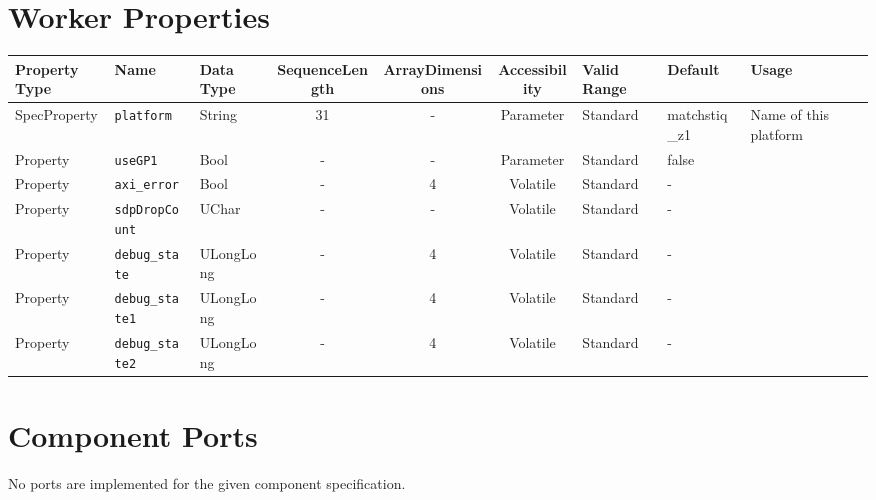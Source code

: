 \documentclass{article}
\begin{document}
\begin{landscape}
	\section*{Worker Properties}
	\begin{scriptsize}
		\begin{tabular}{|p{1.5cm}|p{2.5cm}|p{1.5cm}|c|c|c|p{2cm}|p{2cm}|p{3cm}|}
			\hline
			\rowcolor{blue}
			Property Type & Name                  & Data Type  & SequenceLength & ArrayDimensions & Accessibility       & Valid Range & Default & Usage                        \\
			\hline
			SpecProperty & \verb+platform+       & String & 31            & -               & Parameter           & Standard    & matchstiq\_z1 & Name of this platform  \\
			\hline
			Property     & \verb+useGP1+         & Bool   & -             & -               & Parameter           & Standard    & false   &                              \\
			\hline
			Property     & \verb+axi_error+      & Bool   & -             & 4               & Volatile            & Standard    & -       &                              \\
			\hline
			Property     & \verb+sdpDropCount+   & UChar  & -             & -               & Volatile            & Standard    & -       &                              \\
			\hline
			Property     & \verb+debug_state+    & ULongLong & -          & 4               & Volatile            & Standard    & -       &                              \\
			\hline
			Property     & \verb+debug_state1+   & ULongLong & -          & 4               & Volatile            & Standard    & -       &                              \\
			\hline
			Property     & \verb+debug_state2+   & ULongLong & -          & 4               & Volatile            & Standard    & -       &                              \\
			\hline
		\end{tabular}
	\end{scriptsize}

	\section*{Component Ports}
	No ports are implemented for the given component specification.


\end{landscape}
\end{document}
